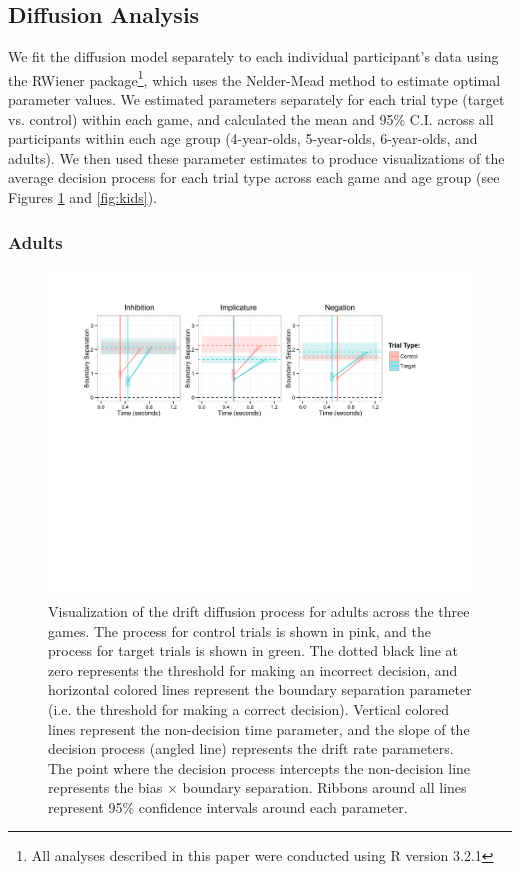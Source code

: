 \documentclass[10pt,letterpaper]{article}
\begin{document}
\subsection{Diffusion Analysis}

We fit the diffusion model separately to each individual participant's data using the RWiener package\footnote{All analyses described in this paper were conducted using R version 3.2.1}, which uses the Nelder-Mead method to estimate optimal parameter values.  We estimated parameters separately for each trial type (target vs. control) within each game, and calculated the mean and 95\% C.I. across all participants within each age group (4-year-olds, 5-year-olds, 6-year-olds, and adults).  We then used these parameter estimates to produce visualizations of the average decision process for each trial type across each game and age group (see Figures \ref{fig:adults} and \ref{fig:kids}).  

\subsubsection{Adults}

\begin{figure}
\begin{center} 
\includegraphics[width=6in]{figures/adult_vis.pdf}
\caption{\label{fig:adults} Visualization of the drift diffusion process for adults across the three games.  The process for control trials is shown in pink, and the process for target trials is shown in green.  The dotted black line at zero represents the threshold for making an incorrect decision, and horizontal colored lines represent the boundary separation parameter (i.e. the threshold for making a correct decision).  Vertical colored lines represent the non-decision time parameter, and the slope of the decision process (angled line) represents the drift rate parameters.  The point where the decision process intercepts the non-decision line represents the bias $\times$ boundary separation.  Ribbons around all lines represent 95\% confidence intervals around each parameter.}
\end{center} 
\end{figure}
\end{document}
